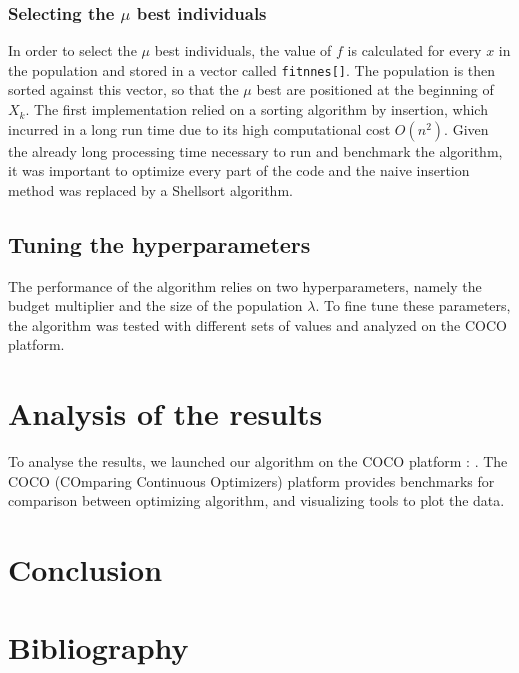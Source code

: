 \documentclass[transmag]{IEEEtran}
\begin{document}
\subsubsection{Selecting the $\mu$ best individuals}
In order to select the $\mu$ best individuals, the value of $f$ is calculated for every $x$ in the population and stored in a vector called \verb|fitnnes[]|. The population is then sorted against this vector, so that the $\mu$ best are positioned at the beginning of $X_k$. 
The first implementation relied on a sorting algorithm by insertion, which incurred in a long run time due to its high computational cost $O(n^2)$. Given the already long processing time necessary to run and benchmark the algorithm, it was important to optimize every part of the code and the naive insertion method was replaced by a Shellsort algorithm. 

\subsection{Tuning the hyperparameters}
The performance of the algorithm relies on two hyperparameters, namely the budget multiplier and the size of the population $\lambda$. To fine tune these parameters, the algorithm was tested with different sets of values and analyzed on the COCO platform.

\section{Analysis of the results}

To analyse the results, we launched our algorithm on the COCO platform : \cite{coco}. The COCO (COmparing Continuous Optimizers) platform provides benchmarks for comparison between optimizing algorithm, and visualizing tools to plot the data.


\section{Conclusion}


\section{Bibliography}


\end{document}
